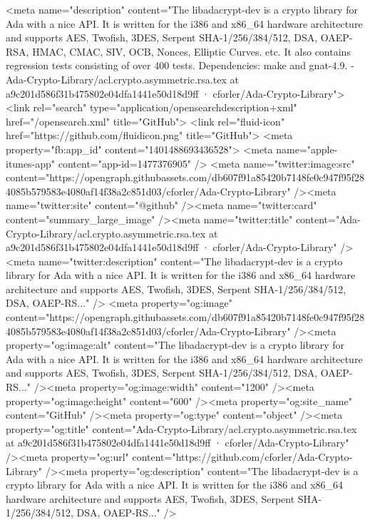       <meta name="description" content="The libadacrypt-dev is a crypto library for Ada with a nice API. It is written for the i386 and x86_64 hardware architecture and supports AES, Twofish, 3DES, Serpent SHA-1/256/384/512, DSA, OAEP-RSA, HMAC, CMAC, SIV, OCB, Nonces, Elliptic Curves. etc. It also contains  regression tests consisting of over 400 tests.   Dependencies: make and gnat-4.9.  - Ada-Crypto-Library/acl.crypto.asymmetric.rsa.tex at a9c201d586f31b475802e04dfa1441e50d18d9ff · cforler/Ada-Crypto-Library">
      <link rel="search" type="application/opensearchdescription+xml" href="/opensearch.xml" title="GitHub">
    <link rel="fluid-icon" href="https://github.com/fluidicon.png" title="GitHub">
    <meta property="fb:app_id" content="1401488693436528">
    <meta name="apple-itunes-app" content="app-id=1477376905" />
      <meta name="twitter:image:src" content="https://opengraph.githubassets.com/db607f91a85420b7148fe0c947f95f284085b579583e4080af14f38a2c851d03/cforler/Ada-Crypto-Library" /><meta name="twitter:site" content="@github" /><meta name="twitter:card" content="summary_large_image" /><meta name="twitter:title" content="Ada-Crypto-Library/acl.crypto.asymmetric.rsa.tex at a9c201d586f31b475802e04dfa1441e50d18d9ff · cforler/Ada-Crypto-Library" /><meta name="twitter:description" content="The libadacrypt-dev is a crypto library for Ada with a nice API. It is written for the i386 and x86_64 hardware architecture and supports AES, Twofish, 3DES, Serpent SHA-1/256/384/512, DSA, OAEP-RS..." />
      <meta property="og:image" content="https://opengraph.githubassets.com/db607f91a85420b7148fe0c947f95f284085b579583e4080af14f38a2c851d03/cforler/Ada-Crypto-Library" /><meta property="og:image:alt" content="The libadacrypt-dev is a crypto library for Ada with a nice API. It is written for the i386 and x86_64 hardware architecture and supports AES, Twofish, 3DES, Serpent SHA-1/256/384/512, DSA, OAEP-RS..." /><meta property="og:image:width" content="1200" /><meta property="og:image:height" content="600" /><meta property="og:site_name" content="GitHub" /><meta property="og:type" content="object" /><meta property="og:title" content="Ada-Crypto-Library/acl.crypto.asymmetric.rsa.tex at a9c201d586f31b475802e04dfa1441e50d18d9ff · cforler/Ada-Crypto-Library" /><meta property="og:url" content="https://github.com/cforler/Ada-Crypto-Library" /><meta property="og:description" content="The libadacrypt-dev is a crypto library for Ada with a nice API. It is written for the i386 and x86_64 hardware architecture and supports AES, Twofish, 3DES, Serpent SHA-1/256/384/512, DSA, OAEP-RS..." />
      
